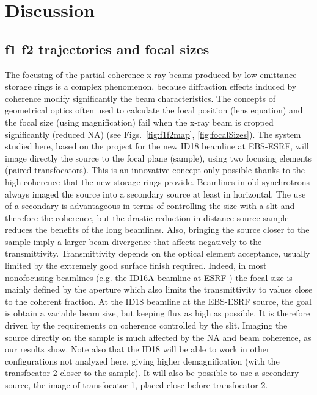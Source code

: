 \documentclass{iucr}              %
\begin{document}
\newpage


\section{Discussion}
\label{sec:discussion}


\subsection{f1 f2 trajectories and focal sizes} 

The focusing of the partial coherence x-ray beams produced by low emittance storage rings is a complex phenomenon, because diffraction effects induced by coherence modify significantly the  beam characteristics. The concepts of geometrical optics often used to calculate the focal position (lens equation) and the focal size (using magnification) fail when the x-ray beam is cropped significantly (reduced NA) (see Figs.~\ref{fig:f1f2map}, \ref{fig:focalSizes}).
The system studied here, based on the project for the new ID18 beamline at EBS-ESRF, will image directly the source to the focal plane (sample), using two focusing elements (paired transfocators). This is an innovative concept only possible thanks to the high coherence that the new storage rings provide. Beamlines in old synchrotrons always imaged the source into a secondary source at least in horizontal. The use of a secondary is advantageous in terms of controlling the size with a slit and therefore the coherence, but the drastic reduction in distance source-sample reduces the benefits of the long beamlines. Also, bringing the source closer to the sample imply a larger beam divergence that affects negatively to the transmittivity. Transmittivity depends on the optical element acceptance, usually limited by the extremely good surface finish required. Indeed, in most nonofocusing beamlines (e.g. the ID16A beamline at ESRF \cite{ID16A, hierarchical}) the focal size is mainly defined by  the aperture which also limits the transmittivity to values close to the coherent fraction. At the ID18 beamline at the EBS-ESRF source, the goal is obtain a variable beam size, but keeping flux as high as possible. It is therefore driven by the requirements on coherence controlled by the slit. Imaging the source directly on the sample is much affected by the NA and beam coherence, as our results show. Note also that the ID18 will be able to work in other configurations not analyzed here, giving higher demagnification (with the transfocator 2 closer to the sample). It will also be possible to use a secondary source, the image of transfocator 1, placed close before transfocator 2.
\end{document}
